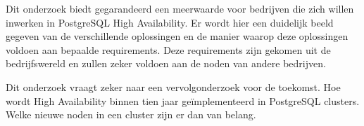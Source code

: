 Dit onderzoek biedt gegarandeerd een meerwaarde voor bedrijven die zich willen inwerken in PostgreSQL High Availability. Er wordt hier een duidelijk beeld gegeven van de verschillende oplossingen en de manier waarop deze oplossingen voldoen aan bepaalde requirements. Deze requirements zijn gekomen uit de bedrijfswereld en zullen zeker voldoen aan de noden van andere bedrijven. 

Dit onderzoek vraagt zeker naar een vervolgonderzoek voor de toekomst. Hoe wordt High Availability binnen tien jaar geïmplementeerd in PostgreSQL clusters. Welke nieuwe noden in een cluster zijn er dan van belang.






